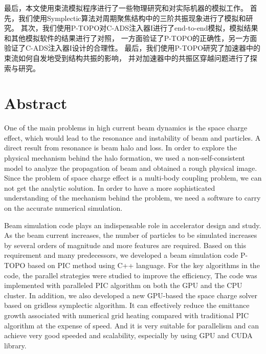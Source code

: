 最后，本文使用束流模拟程序进行了一些物理研究和对实际机器的模拟工作。
首先，我们使用Symplectic算法对周期聚焦结构中的三阶共振现象进行了模拟和研究。
其次，我们使用P-TOPO对C-ADS注入器I进行了end-to-end模拟，模拟结果和其他模拟软件的结果进行了对照，
一方面验证了P-TOPO的正确性，另一方面验证了C-ADS注入器I设计的合理性。
最后，我们使用P-TOPO研究了加速器中的束流如何自发地受到结构共振的影响，
并对加速器中的共振区穿越问题进行了探索与研究。




\chapter{Abstract}%

One of the main problems in high current beam dynamics is the space charge effect, which would lead to the resonance and instability of beam and particles.
A direct result from resonance is beam halo and loss.
In order to explore the physical mechanism behind the halo formation, we used a non-self-consistent model to analyze the propagation of beam and obtained a rough physical image.
Since the problem of space charge effect is a multi-body coupling problem, we can not get the analytic solution.
In order to have a more sophisticated understanding of the mechanism behind the problem, we need a software to carry on the accurate numerical simulation.

Beam simulation code plays an indispensable role in accelerator design and study.
As the beam current increases, the number of particles to be simulated increases by several orders of magnitude
and more features are required.
Based on this requirement and many predecessors, we developed a beam 
simulation code P-TOPO based on PIC method using C++ language.
For the key algorithms in the code, the parallel strategies were studied to improve the efficiency, 
The code was implemented with paralleled PIC algorithm on both the GPU and the CPU cluster.
In addition, we also developed a new GPU-based the space charge solver based on gridless symplectic algorithm.
It can effectively reduce the emittance growth associated with numerical grid heating compared with traditional PIC algorithm at the expense of speed.
And it is very suitable for parallelism and can achieve very good speeded and scalability, especially by using GPU and CUDA library.


